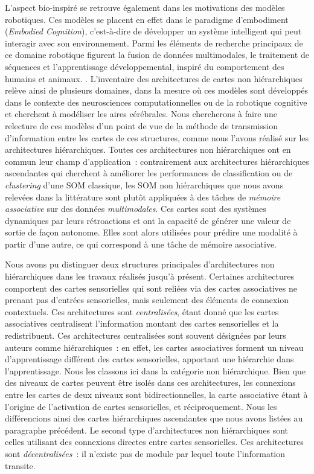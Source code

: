 \documentclass[../main]{subfiles}
\begin{document}
L'aspect bio-inspiré se retrouve également dans les motivations des modèles robotiques. Ces modèles se placent en effet dans le paradigme d'embodiment (\emph{Embodied Cognition}), c'est-à-dire de développer un système intelligent qui peut interagir avec son environnement. Parmi les éléments de recherche principaux de ce domaine robotique figurent la fusion de données multimodales, le traitement de séquences et l'apprentissage développemental, inspiré du comportement des humains et animaux. \cite{Smith2005TheDO}.
L'inventaire des architectures de cartes non hiérarchiques relève ainsi de plusieurs domaines, dans la mesure où ces modèles sont développés dans le contexte des neurosciences computationnelles ou de la robotique cognitive et cherchent à modéliser les aires cérébrales. 
Nous chercherons à faire une relecture de ces modèles d'un point de vue de la méthode de transmission d'information entre les cartes de ces structures, comme nous l'avons réalisé sur les architectures hiérarchiques.
Toutes ces architectures non hiérarchiques ont en commun leur champ d'application~: contrairement aux architectures hiérarchiques ascendantes qui cherchent à améliorer les performances de classification ou de \emph{clustering} d'une SOM classique, les SOM non hiérarchiques que nous avons relevées dans la littérature sont plutôt appliquées à des tâches de \emph{mémoire associative} sur des données \emph{multimodales}.
Ces cartes sont des systèmes dynamiques par leurs rétroactions et ont la capacité de générer une valeur de sortie de façon autonome. Elles sont alors utilisées pour prédire une modalité à partir d'une autre, ce qui correspond à une tâche de mémoire associative.


Nous avons pu distinguer deux structures principales d'architectures non hiérarchiques dans les travaux réalisés jusqu'à présent.
Certaines architectures comportent des cartes sensorielles qui sont reliées via des cartes associatives ne prenant pas d'entrées sensorielles, mais seulement des éléments de connexion contextuels. 
Ces architectures sont \emph{centralisées}, étant donné que les cartes associatives centralisent l'information  montant des cartes sensorielles et la redistribuent. Ces architectures centralisées sont souvent désignées par leurs auteurs comme hiérarchiques~: en effet, les cartes associatives forment un niveau d'apprentissage différent des cartes sensorielles, apportant une hiérarchie dans l'apprentissage. Nous les classons ici dans la catégorie non hiérarchique. Bien que des niveaux de cartes peuvent être isolés dans ces architectures, les connexions entre les cartes de deux niveaux sont bidirectionnelles, la carte associative étant à l'origine de l'activation de cartes sensorielles, et réciproquement.
Nous les différencions ainsi des cartes hiérarchiques ascendantes que nous avons listées au paragraphe précédent.
Le second type d'architectures non hiérarchiques sont celles utilisant des connexions directes entre cartes sensorielles. Ces architectures sont \emph{décentralisées}~: il n'existe pas de module par lequel toute l'information transite.
\end{document}
